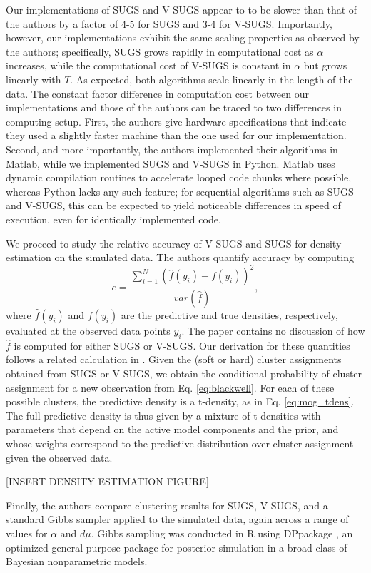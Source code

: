 \documentclass{uwstat572}
\begin{document}
Our implementations of SUGS and V-SUGS appear to to be slower than that of the authors by a factor of 4-5 for SUGS and 3-4 for V-SUGS. Importantly, however, our implementations exhibit the same scaling properties as observed by the authors; specifically, SUGS grows rapidly in computational cost as $\alpha$ increases, while the computational cost of V-SUGS is constant in $\alpha$ but grows linearly with $T$. As expected, both algorithms scale linearly in the length of the data. The constant factor difference in computation cost between our implementations and those of the authors can be traced to two differences in computing setup. First, the authors give hardware specifications that indicate they used a slightly faster machine than the one used for our implementation. Second, and more importantly, the authors implemented their algorithms in Matlab, while we implemented SUGS and V-SUGS in Python. Matlab uses dynamic compilation routines to accelerate looped code chunks where possible, whereas Python lacks any such feature; for sequential algorithms such as SUGS and V-SUGS, this can be expected to yield noticeable differences in speed of execution, even for identically implemented code. 

We proceed to study the relative accuracy of V-SUGS and SUGS for density estimation on the simulated data. The authors quantify accuracy by computing 
$$ e = \frac{\sum_{i=1}^N (\hat{f}(y_i)-f(y_i))^2}{var(\hat{f})},$$
where $\hat{f}(y_i)$ and $f(y_i)$ are the predictive and true densities, respectively, evaluated at the observed data points $y_i$. The paper contains no discussion of how $\hat{f}$ is computed for either SUGS or V-SUGS. Our derivation for these quantities follows a related calculation in \cite{west}. Given the (soft or hard) cluster assignments obtained from SUGS or V-SUGS, we obtain the conditional probability of cluster assignment for a new observation from Eq. \ref{eq:blackwell}. For each of these possible clusters, the predictive density is a t-density, as in Eq. \ref{eq:mog_tdens}. The full predictive density is thus given by a mixture of t-densities with parameters that depend on the active model components and the prior, and whose weights correspond to the predictive distribution over cluster assignment given the observed data. 

[INSERT DENSITY ESTIMATION FIGURE]

Finally, the authors compare clustering results for SUGS, V-SUGS, and a standard Gibbs sampler applied to the simulated data, again across a range of values for $\alpha$ and $d\mu$. Gibbs sampling was conducted in R using DPpackage \citep{jara}, an optimized general-purpose package for posterior simulation in a broad class of Bayesian nonparametric models.
\end{document}

